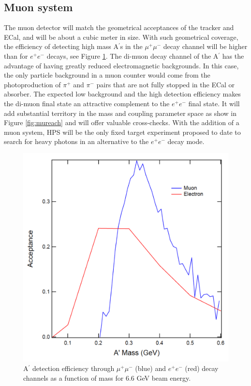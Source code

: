 \subsection{Muon system}

\label{sec:muon}


The muon detector will match the geometrical acceptances of the tracker and ECal, and will be about a cubic meter in size. With such 
geometrical coverage, the efficiency of detecting high mass A$^\prime$s in the $\mu^+\mu^-$ decay channel will be higher than for $e^+e^-$ 
decays, see Figure \ref{fig:muacc}. The di-muon decay channel of the A$^\prime$ has the advantage of having greatly reduced electromagnetic 
backgrounds.  In this case, the only particle background in a muon counter would come from the photoproduction of $\pi^+$ and $\pi^-$ pairs
that are not fully stopped in the ECal or absorber.  The expected low background and the high detection efficiency makes the di-muon final state an
attractive complement to the $e^+e^-$ final state. It will add substantial territory in the mass and coupling
parameter space as show in Figure \ref{fig:mureach} and will offer valuable cross-checks. With the addition of a muon system, HPS will be the 
only fixed target experiment proposed to date to search for heavy photons in an alternative to the $e^+e^-$ decay mode.

\begin{figure}[!ht]
\includegraphics[scale=0.4]{muon/acc.pdf}
\caption{\small{A$^\prime$ detection efficiency through $\mu^+\mu^-$ (blue) and $e^+e^-$ (red) decay channels as a function of mass for 6.6 
GeV beam energy.}}\label{fig:muacc}
\end{figure}

